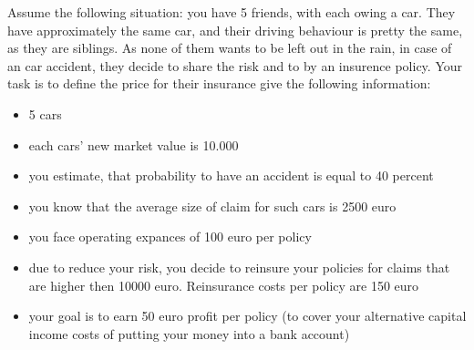 \documentclass[11pt,a4paper,fleqn]{article}      %
\begin{document}
Assume the following situation: you have 5 friends, with each owing a car. They have approximately the same car, and their driving behaviour is pretty the same, as they are siblings. As none of them wants to be left out in the rain, in case of an car accident, they decide to share the risk and to by an insurence policy. Your task is to define the price for their insurance give the following information:
\begin{itemize}
\item 5 cars
\item each cars' new market value is 10.000
\item you estimate, that probability to have an accident is equal to 40 percent
\item you know that the average size of claim for such cars is 2500 euro
\item you face operating expances of 100 euro per policy
\item due to reduce your risk, you decide to reinsure your policies for claims that are higher then 10000 euro. Reinsurance costs per policy are 150 euro
\item your goal is to earn 50 euro profit per policy (to cover your alternative capital income costs of putting your money into a bank account)
\end{itemize}
\end{document}
